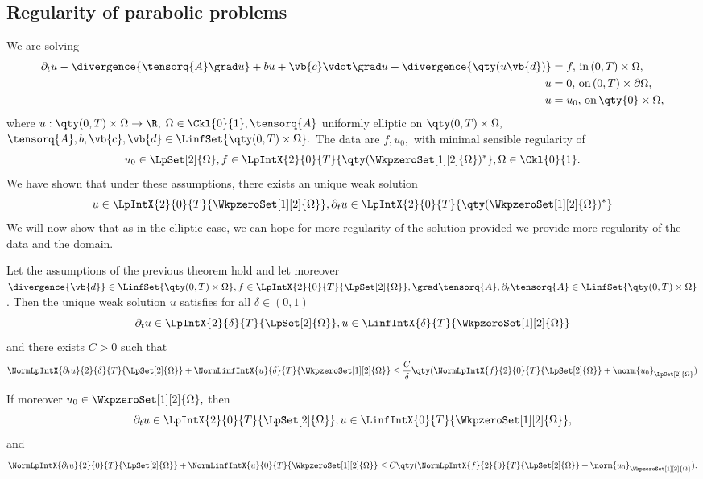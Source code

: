 \subsection{Regularity of parabolic problems}
\label{sec:parabolic_regularity}
We are solving	
\begin{align*}
	\partial_t u - \divergence{\tensorq{A}\grad u} + b u + \vb{c}\vdot \grad u + \divergence{\qty(u \vb{d})} &= f, \, \text{in} \, (0,T) \times \Omega, \\
	u &= 0, \, \text{on} \, (0,T) \times \partial \Omega,\\
	u &= u_0, \, \text{on} \, \qty{0} \times \Omega,
\end{align*}
where $u: \qty(0,T) \times \Omega \to \R,$ $\Omega \in \Ckl{0}{1}, \tensorq{A}$ uniformly elliptic on $\qty(0,T) \times \Omega,$ $\tensorq{A}, b, \vb{c}, \vb{d} \in \LinfSet{\qty(0,T) \times \Omega}.$ The data are $f, u_0,$ with minimal sensible regularity of
\[
	u_0 \in \LpSet[2]{\Omega}, f \in \LpIntX{2}{0}{T}{\qty(\WkpzeroSet[1][2]{\Omega})^{*}}, \Omega \in \Ckl{0}{1}.
\]
We have shown that under these assumptions, there exists an unique weak solution
\[
	u \in \LpIntX{2}{0}{T}{\WkpzeroSet[1][2]{\Omega}}, \partial_t u\in \LpIntX{2}{0}{T}{\qty(\WkpzeroSet[1][2]{\Omega})^{*}}
\]
We will now show that as in the elliptic case, we can hope for more regularity of the solution provided we provide more regularity of the data and the domain.

\begin{theorem}
	Let the assumptions of the previous theorem hold and let moreover $ \divergence{\vb{d}} \in \LinfSet{\qty(0,T) \times \Omega}, f \in \LpIntX{2}{0}{T}{\LpSet[2]{\Omega}}, \grad \tensorq{A}, \partial_t \tensorq{A} \in \LinfSet{\qty(0,T) \times \Omega}$. Then the unique weak solution $u$ satisfies for all $\delta \in (0,1)$
	\[
		\partial_t u \in \LpIntX{2}{\delta}{T}{\LpSet[2]{\Omega}}, u \in \LinfIntX{\delta}{T}{\WkpzeroSet[1][2]{\Omega}}
	\]
	and there exists $C>0$  such that
	\[
		\NormLpIntX{\partial_t u}{2}{\delta}{T}{\LpSet[2]{\Omega}} + \NormLinfIntX{u}{\delta}{T}{\WkpzeroSet[1][2]{\Omega}} \leq \frac{C}{\delta}\qty(\NormLpIntX{f}{2}{0}{T}{\LpSet[2]{\Omega}} + \norm{u_0}_{\LpSet[2]{\Omega}})
	\]

	If moreover $u_0 \in \WkpzeroSet[1][2]{\Omega},$ then
	\[
		\partial_t u \in \LpIntX{2}{0}{T}{\LpSet[2]{\Omega}}, u \in \LinfIntX{0}{T}{\WkpzeroSet[1][2]{\Omega}},
	\]
	and
	\[
		\NormLpIntX{\partial_t u}{2}{0}{T}{\LpSet[2]{\Omega}} + \NormLinfIntX{u}{0}{T}{\WkpzeroSet[1][2]{\Omega}} \leq C\qty(\NormLpIntX{f}{2}{0}{T}{\LpSet[2]{\Omega}} + \norm{u_0}_{\WkpzeroSet[1][2]{\Omega}}).
	\]
\end{theorem}


